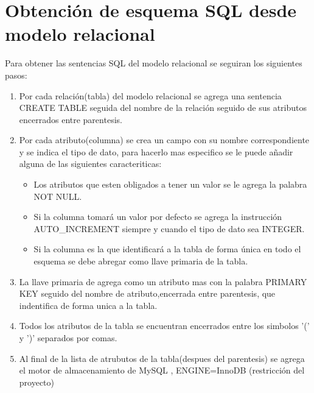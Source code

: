 \section{Obtención de esquema SQL desde modelo relacional}

Para obtener las sentencias SQL del modelo relacional se seguiran los siguientes pasos:

\begin{enumerate}
  \item Por cada relación(tabla) del modelo relacional se agrega una sentencia CREATE TABLE seguida del nombre de la relación seguido de sus atributos encerrados entre parentesis.
  \item Por cada atributo(columna) se crea un campo con su nombre correspondiente y se indica el tipo de dato, para hacerlo mas especifico se le puede añadir alguna de las siguientes caracteriticas:
  \begin{itemize}
    \item Los atributos que esten obligados a tener un valor se le agrega la palabra NOT NULL.
    \item Si la columna tomará un valor por defecto se agrega la instrucción AUTO\_INCREMENT siempre y cuando el tipo de dato sea INTEGER.
    \item Si la columna es la que identificará a la tabla de forma única en todo el esquema se debe abregar como llave primaria de la tabla.
  \end{itemize}
  \item La llave primaria de agrega como un atributo mas con la palabra PRIMARY KEY seguido del nombre de atributo,encerrada entre parentesis, que indentifica de forma unica a la tabla.
  \item Todos los atributos de la tabla se encuentran encerrados entre los simbolos '(' y ')' separados por comas.
  \item Al final de la lista de atrubutos de la tabla(despues del parentesis) se agrega el motor de almacenamiento de MySQL , ENGINE=InnoDB (restricción del proyecto)

\end{enumerate}